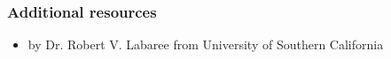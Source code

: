 \documentclass[aspectratio=169]{beamer}
\begin{document}
\begin{frame}
    \frametitle{Additional resources}
    \begin{itemize}
        \item \href{https://libguides.usc.edu/writingguide/purpose}{\color{blue}{Organizing Your Social Sciences Research Paper}} by Dr. Robert V. Labaree from University of Southern California
    \end{itemize}

\end{frame}
\end{document}
